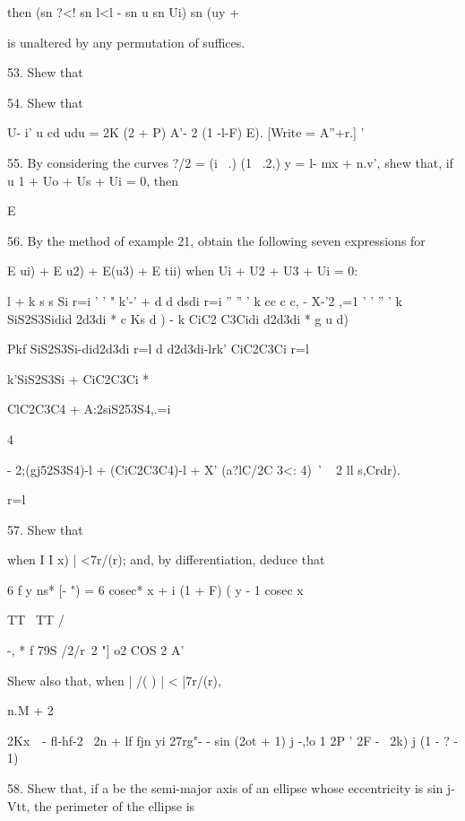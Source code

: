 then (sn ?<! sn l<l - sn u sn Ui) sn (uy + %

is unaltered by any permutation of suffices. 

53. Shew that


54. Shew that

U- i' u cd udu = 2K (2 + P) A'- 2 (1 -l-F) E). [Write = A''+r.] '

55. By considering the curves ?/2 = (i \ .) (1 \ .2,) y = l- mx +
n.v', shew that, if u 1 + Uo + Us + Ui = 0, then

E %


56. By the method of example 21, obtain the following seven
expressions for

E ui) + E u2) + E(u3) + E tii) when Ui + U2 + U3 + Ui = 0:

l + k s s Si r=i ' ' " k'-' + d d dsdi r=i '' '' ' k cc c c, - X-'2
,=1 ' ' '' ' k SiS2S3Sidid 2d3di * c Ks d ) - k CiC2 C3Cidi d2d3di * g
u d)

Pkf SiS2S3Si-did2d3di r=l d d2d3di-lrk' CiC2C3Ci r=l

k'SiS2S3Si + CiC2C3Ci *

ClC2C3C4 + A:2siS253S4,.=i

4

- 2;(gj52S3S4)-l + (CiC2C3C4)-l + X' (a?lC/2C 3<: 4)~' ~ 2 ll s,Crdr).

r=l


%
%

57. Shew that

when I I x) | <7r/(r); and, by differentiation, deduce that

6 f y ns* [- ") = 6 cosec* x + i (1 + F) ( y - 1 cosec x

TT \ TT /

 -, * f 79S /2/r\ 2 "] o2 COS 2 A'

Shew also that, when | /( ) | < |7r/(r),

n.M + 2

2Kx\ \ - fl-hf-2 \ 2n + lf fjn yi 27rg"- - sin (2ot + 1) j -,!o 1 2P
' 2F - \ 2k) j (1 - ? - 1) 


58. Shew that, if a be the semi-major axis of an ellipse whose
eccentricity is sin j-Vtt, the perimeter of the ellipse is

